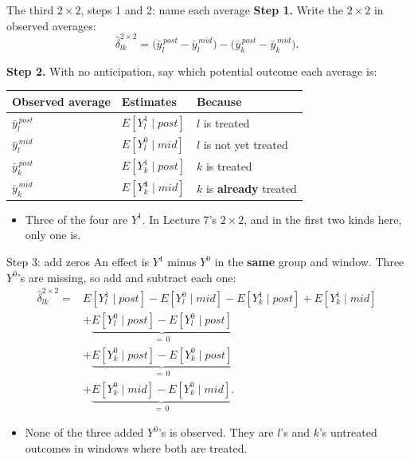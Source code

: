 \documentclass[
  11pt,
  ignorenonframetext,
  aspectratio=169,
]{beamer}
\providecommand{\tightlist}{%
  \setlength{\itemsep}{0pt}\setlength{\parskip}{0pt}}
\begin{document}
\begin{frame}{The third \(2 \times 2\), steps 1 and 2: name each
average}
\protect{}\label{the-third-2-times-2-steps-1-and-2-name-each-average}
\textbf{Step 1.} Write the \(2 \times 2\) in observed averages: \[
\hat\delta^{2\times2}_{lk} = \big(\bar y_l^{\,post} - \bar y_l^{\,mid}\big) - \big(\bar y_k^{\,post} - \bar y_k^{\,mid}\big).
\]

\textbf{Step 2.} With no anticipation, say which potential outcome each
average is:

\begin{center}\small
\begin{tabular}{lll}
\toprule
Observed average & Estimates & Because \\
\midrule
$\bar y_l^{\,post}$ & $E[Y^1_l \mid post]$ & $l$ is treated \\
$\bar y_l^{\,mid}$ & $E[Y^0_l \mid mid]$ & $l$ is not yet treated \\
$\bar y_k^{\,post}$ & $E[Y^1_k \mid post]$ & $k$ is treated \\
$\bar y_k^{\,mid}$ & $E[Y^{\mathbf{1}}_k \mid mid]$ & $k$ is \textbf{already} treated \\
\bottomrule
\end{tabular}
\end{center}

\begin{itemize}
\tightlist
\item
  Three of the four are \(Y^1\). In Lecture 7's \(2 \times 2\), and in
  the first two kinds here, only one is.
\end{itemize}
\end{frame}

\begin{frame}{Step 3: add zeros}
\protect{}\label{step-3-add-zeros}
An effect is \(Y^1\) minus \(Y^0\) in the \textbf{same} group and
window. Three \(Y^0\)'s are missing, so add and subtract each one: \[
\begin{aligned}
\hat\delta^{2\times2}_{lk} ={}& E[Y^1_l \mid post] - E[Y^0_l \mid mid] - E[Y^1_k \mid post] + E[Y^1_k \mid mid] \\[3pt]
&+ \underbrace{E[Y^0_l \mid post] - E[Y^0_l \mid post]}_{=\,0} \\
&+ \underbrace{E[Y^0_k \mid post] - E[Y^0_k \mid post]}_{=\,0} \\
&+ \underbrace{E[Y^0_k \mid mid] - E[Y^0_k \mid mid]}_{=\,0} .
\end{aligned}
\]

\begin{itemize}
\tightlist
\item
  None of the three added \(Y^0\)'s is observed. They are \(l\)'s and
  \(k\)'s untreated outcomes in windows where both are treated.
\end{itemize}
\end{frame}
\end{document}
